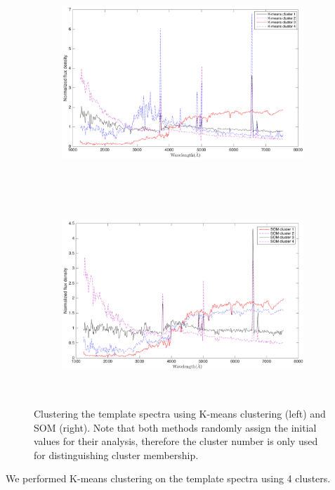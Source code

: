     \begin{figure}
    \begin{subfigure}[b]{0.49\textwidth}
        \centering
        \includegraphics[width=.99\textwidth, height=         7.5cm]{k_means_images/classified_group_in_4cluster_kinney.png}
    \end{subfigure}
    \hfill
        \begin{subfigure}[b]{0.49\textwidth}
        \centering \includegraphics[width=.99\textwidth, height=         7.5cm]{k_means_images/classified_group_in_4cluster_som.png}
    \end{subfigure}
    \caption{Clustering the  template spectra using K-means clustering     (left) and SOM (right). Note that both methods randomly assign the initial values for their analysis, therefore the cluster number is only used for distinguishing cluster membership.}
    \label{fig: som_k_means_4}
    \end{figure}
        
    We performed K-means clustering on the  template spectra using 4 clusters.
  
